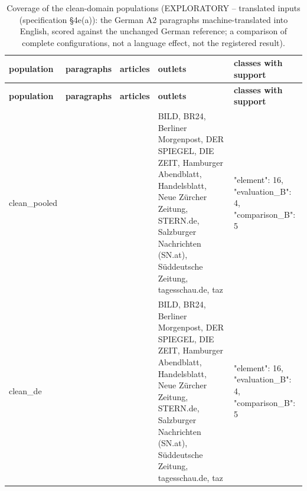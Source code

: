 \begingroup\footnotesize
\begin{longtable}{>{\raggedright\arraybackslash}p{66.8pt}>{\raggedright\arraybackslash}p{65.6pt}>{\raggedright\arraybackslash}p{52.9pt}>{\raggedright\arraybackslash}p{120.6pt}>{\raggedright\arraybackslash}p{89.2pt}}
\caption{Coverage of the clean-domain populations (EXPLORATORY -- translated inputs (specification §4e(a)):\allowbreak{} the German A2 paragraphs machine-translated into English, scored against the unchanged German reference; a comparison of complete configurations, not a language effect, not the registered result).} \\
\toprule
\textbf{population} & \textbf{paragraphs} & \textbf{articles} & \textbf{outlets} & \textbf{classes with support} \\
\midrule
\endfirsthead
\toprule
\textbf{population} & \textbf{paragraphs} & \textbf{articles} & \textbf{outlets} & \textbf{classes with support} \\
\midrule
\endhead
\bottomrule
\endfoot
clean\_\allowbreak{}pooled & 49 & 24 & BILD, BR24, Berliner Morgenpost, DER SPIEGEL, DIE ZEIT, Hamburger Abendblatt, Handelsblatt, Neue Zürcher Zeitung, STERN.de, Salzburger Nachrichten (SN.at), Süddeutsche Zeitung, tagesschau.de, taz & {"element":\allowbreak{} 16, "evaluation\_\allowbreak{}B":\allowbreak{} 4, "comparison\_\allowbreak{}B":\allowbreak{} 5} \\
clean\_\allowbreak{}de & 49 & 24 & BILD, BR24, Berliner Morgenpost, DER SPIEGEL, DIE ZEIT, Hamburger Abendblatt, Handelsblatt, Neue Zürcher Zeitung, STERN.de, Salzburger Nachrichten (SN.at), Süddeutsche Zeitung, tagesschau.de, taz & {"element":\allowbreak{} 16, "evaluation\_\allowbreak{}B":\allowbreak{} 4, "comparison\_\allowbreak{}B":\allowbreak{} 5} \\
\end{longtable}
\endgroup
